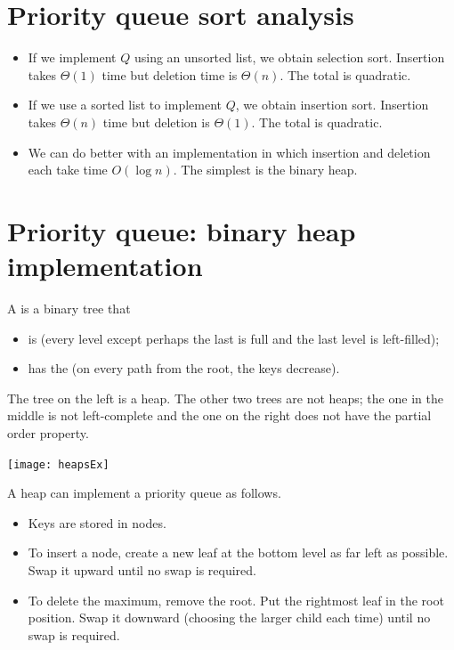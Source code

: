 \section{Priority queue sort analysis}
\begin{itemize}
\item If we implement $Q$ using an unsorted list, we obtain selection sort. 
Insertion takes $\Theta(1)$ time but deletion time is $\Theta(n)$. The total is quadratic.
\item If we use a sorted list to implement $Q$, we obtain insertion sort. 
Insertion takes $\Theta(n)$ time but deletion is $\Theta(1)$. The total is quadratic.
\item We can do better with an implementation in which insertion and deletion 
each take time $O(\log n)$. The simplest is the binary heap.
\end{itemize}

\section{Priority queue: binary heap implementation}
\begin{Definition}
A  is a binary tree that 
\begin{itemize}
\item is  (every level except perhaps the last is full and 
the last level is left-filled);
\item has the  (on every path from the root, the keys decrease). 
\end{itemize}
\end{Definition}

\begin{Boxample}
The tree on the left is a heap. The other two trees are not heaps; 
the one in the middle is not left-complete and the one on the right does not have the partial order property.
\begin{center}
\texttt{[image: heapsEx]}
\end{center}
\end{Boxample}

A heap can implement a priority queue as follows. 
\begin{itemize}
\item Keys are stored in nodes. 
\item To insert a node, create a new leaf at the bottom level as far left as 
possible. Swap it upward until no swap is required. 
\item To delete the maximum, remove the root. Put the rightmost leaf in the root
 position. Swap it downward (choosing the larger child each time) until no swap 
is required. 
\end{itemize}


